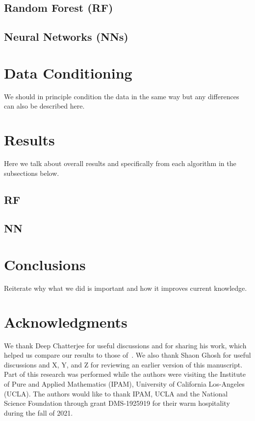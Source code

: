 \documentclass[aps,prd,twocolumn,superscriptaddress,preprintnumbers,floatfix,nofootinbib]{revtex4-2}
\begin{document}
\subsection{Random Forest (RF)}

\subsection{Neural Networks (NNs)}


\section{Data Conditioning}
\label{sec:BMSFramesIntro}
We should in principle condition the data in the same way but any differences
can also be described here.



\section{Results}
Here we talk about overall results and specifically from each algorithm in the
subsections below.
\subsection{RF}

\subsection{NN}


\section{Conclusions}
Reiterate why what we did is important and how it improves current knowledge.

\section*{Acknowledgments}
We thank Deep Chatterjee for useful discussions and for sharing his work, which
helped us compare our results to those of~\cite{Chatterjee:2019avs}. We also
thank Shaon Ghosh for useful discussions and X, Y, and Z for reviewing an
earlier version of this manuscript. Part of this research was performed while
the authors were visiting the Institute of Pure and Applied Mathematics (IPAM), 
University of California Los-Angeles (UCLA). The authors would like to thank 
IPAM, UCLA and the National Science Foundation through grant DMS-1925919 for
their warm hospitality during the fall of 2021. 
%
\end{document}
